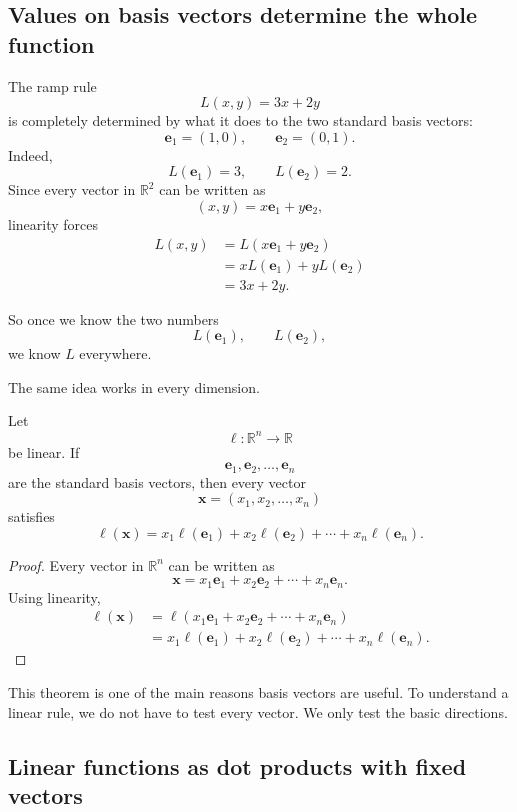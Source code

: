 \subsection{Values on basis vectors determine the whole function}

The ramp rule
\[
    L(x,y)=3x+2y
\]
is completely determined by what it does to the two standard basis vectors:
\[
    \mathbf e_1=(1,0),
    \qquad
    \mathbf e_2=(0,1).
\]
Indeed,
\[
    L(\mathbf e_1)=3,
    \qquad
    L(\mathbf e_2)=2.
\]
Since every vector in \(\mathbb R^2\) can be written as
\[
    (x,y)=x\mathbf e_1+y\mathbf e_2,
\]
linearity forces
\[
\begin{aligned}
L(x,y)
&=
L(x\mathbf e_1+y\mathbf e_2)\\
&=
xL(\mathbf e_1)+yL(\mathbf e_2)\\
&=
3x+2y.
\end{aligned}
\]

So once we know the two numbers
\[
    L(\mathbf e_1),\qquad L(\mathbf e_2),
\]
we know \(L\) everywhere.

The same idea works in every dimension.

\begin{theorem}
Let
\[
    \ell:\mathbb R^n\to\mathbb R
\]
be linear.  If
\[
    \mathbf e_1,\mathbf e_2,\ldots,\mathbf e_n
\]
are the standard basis vectors, then every vector
\[
    \mathbf x=(x_1,x_2,\ldots,x_n)
\]
satisfies
\[
\boxed{
    \ell(\mathbf x)
    =
    x_1\ell(\mathbf e_1)+x_2\ell(\mathbf e_2)+\cdots+x_n\ell(\mathbf e_n).
}
\]
\end{theorem}

\begin{proof}
Every vector in \(\mathbb R^n\) can be written as
\[
    \mathbf x=x_1\mathbf e_1+x_2\mathbf e_2+\cdots+x_n\mathbf e_n.
\]
Using linearity,
\[
\begin{aligned}
\ell(\mathbf x)
&=
\ell(x_1\mathbf e_1+x_2\mathbf e_2+\cdots+x_n\mathbf e_n)\\
&=
x_1\ell(\mathbf e_1)+x_2\ell(\mathbf e_2)+\cdots+x_n\ell(\mathbf e_n).
\end{aligned}
\]
\end{proof}

This theorem is one of the main reasons basis vectors are useful.  To understand a
linear rule, we do not have to test every vector.  We only test the basic directions.

\subsection{Linear functions as dot products with fixed vectors}

